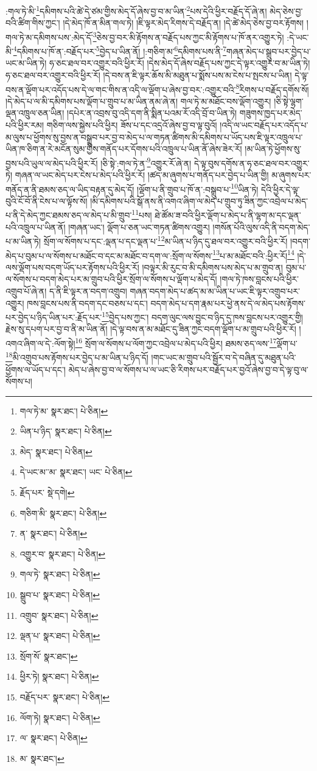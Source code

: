 :གལ་ཏེ་མི་\footnote{གལ་ཏེ་མ་  སྣར་ཐང་།  པེ་ཅིན། }དམིགས་པའི་ཚེ་དེ་ཙམ་གྱིས་མེད་དོ་ཞེས་བྱ་བ་མ་ཡིན་\footnote{ཡིན་པ་ཉིད་  སྣར་ཐང་།  པེ་ཅིན། }པས་དེའི་ཕྱིར་བརྗོད་དོ་ཞེ་ན། མེད་ཅེས་བྱ་བའི་ཚིག་གིས་ཀྱང་། །དེ་མེད་ཁོ་ན་མིན་གལ་ཏེ། །ཇི་ལྟར་མེད་རིགས་དེ་བརྗོད་ན། །དེ་ཚེ་མེད་ཅེས་བྱ་བར་རྟོགས། །གལ་ཏེ་མ་དམིགས་པས་:མེད་དོ་\footnote{མེད་  སྣར་ཐང་།  པེ་ཅིན། }ཅེས་བྱ་བར་མི་རྟོགས་ན་བརྗོད་པས་ཀྱང་མི་རྟོགས་པ་ཁོ་ནར་འགྱུར་ཏེ། :དེ་ཡང་མི་\footnote{དེ་ཡང་མ་་མ་  སྣར་ཐང་། ཡང་  པེ་ཅིན། }དམིགས་པ་ཁོ་ན་:བརྗོད་པར་\footnote{རྗོད་པར་  སྡེ་དགེ། }བྱེད་པ་ཡིན་ནོ། །:གཅིག་མ་\footnote{གཅིག་མི་  སྣར་ཐང་།  པེ་ཅིན། }དམིགས་པས་ནི་\footnote{ན་  སྣར་ཐང་།  པེ་ཅིན། }གཞན་མེད་པ་སྒྲུབ་པར་བྱེད་པ་ཡང་མ་ཡིན་ཏེ། ཧ་ཅང་ཐལ་བར་འགྱུར་བའི་ཕྱིར་རོ། །དེས་མེད་དོ་ཞེས་བརྗོད་པས་ཀྱང་དེ་ལྟར་འགྱུར་བ་མ་ཡིན་ཏེ། ཧ་ཅང་ཐལ་བར་འགྱུར་བའི་ཕྱིར་རོ། །དེ་བས་ན་ཇི་ལྟར་ཆོས་མི་མཐུན་པ་སྨོས་པས་མ་ངེས་པ་སྤངས་པ་ཡིན། དེ་ལྟ་བས་ན་ལྡོག་པར་འདོད་པས་དེ་ལ་གང་གིས་ན་འདི་ལ་ལྡོག་པ་ཞེས་བྱ་བར་:འགྱུར་བའི་\footnote{འགྱུར་བ་  སྣར་ཐང་།  པེ་ཅིན། }རིགས་པ་བརྗོད་དགོས་སོ། །དེ་མེད་པ་ལ་མི་དམིགས་པས་ལྡོག་པ་གྲུབ་པ་མ་ཡིན་ནམ་ཞེ་ན། གལ་ཏེ་མ་མཐོང་བས་ལྡོག་འགྱུར། །ཅི་སྟེ་ལྷག་ལྡན་འཁྲུལ་ཅན་ཡིན། །དཔེར་ན་འབྲས་བུ་འདི་དག་ནི་སྨིན་པའམ་རོ་འདི་བྲོ་བ་ཡིན་ཏེ། གཟུགས་ཁྱད་པར་མེད་པའི་ཕྱིར་རམ། གཅིག་ལས་སྐྱེས་པའི་ཕྱིར། ཟོས་པ་དང་འདྲའོ་ཞེས་བྱ་བ་ལྟ་བུའོ། །འདི་ལ་ཡང་བརྗོད་པར་འདོད་པ་མ་ལུས་པ་ཕྱོགས་སུ་བྱས་ན་བསྒྲུབ་པར་བྱ་བ་མེད་པ་ལ་གཏན་ཚིགས་མི་དམིགས་པ་ཡོད་པས་ཇི་ལྟར་འཁྲུལ་པ་ཡིན་ཁ་ཅིག་ན་རེ་མངོན་སུམ་གྱིས་གནོད་པར་དོགས་པའི་འཁྲུལ་པ་ཡིན་ནོ་ཞེས་ཟེར་རོ། །མ་ཡིན་ཏེ་ཕྱོགས་སུ་བྱས་པའི་ཡུལ་ལ་མེད་པའི་ཕྱིར་རོ། །ཅི་སྟེ་:གལ་ཏེ་ན་\footnote{གལ་ཏེ་  སྣར་ཐང་།  པེ་ཅིན། }འགྱུར་རོ་ཞེ་ན། དེ་ལྟ་བུས་དགོས་ན་ཧ་ཅང་ཐལ་བར་འགྱུར་ཏེ། གཞན་ལ་ཡང་མེད་པར་ངེས་པ་མེད་པའི་ཕྱིར་རོ། །ཚད་མ་ཞུགས་པ་གནོད་པར་བྱེད་པ་ཡིན་གྱི། མ་ཞུགས་པར་གནོད་ན་ནི་ཐམས་ཅད་ལ་ཡིད་བརྟན་དུ་མེད་དོ། །ལྡོག་པ་ནི་གྲུབ་པ་ཁོ་ན་:བསྒྲུབ་པ་\footnote{སྒྲུབ་པ་  སྣར་ཐང་།  པེ་ཅིན། }ཡིན་ཏེ། དེའི་ཕྱིར་དེ་ལྟ་བུའི་ངོ་བོ་ནི་ངེས་པ་ལ་ལྟོས་སོ། །མི་དམིགས་པའི་སྒོ་ནས་ནི་འགའ་ཞིག་ལ་མེད་པ་གྲུབ་ཏུ་ཟིན་ཀྱང་འབྲེལ་པ་མེད་པ་ནི་དེ་མེད་ཀྱང་ཐམས་ཅད་ལ་མེད་པ་མི་གྲུབ་\footnote{འགྲུབ་  སྣར་ཐང་།  པེ་ཅིན། }པས། ཐེ་ཚོམ་ཟ་བའི་ཕྱིར་ལྡོག་པ་མེད་པ་ནི་ལྷག་མ་དང་ལྡན་པའི་འཁྲུལ་པ་ཡིན་ནོ། །གཞན་ཡང་། ལྡོག་པ་ཅན་ཡང་གཏན་ཚིགས་འགྱུར། །གསོན་པོའི་ལུས་འདི་ནི་བདག་མེད་པ་མ་ཡིན་ཏེ། སྲོག་ལ་སོགས་པ་དང་:ལྡན་པ་དང་ལྡན་པ་\footnote{ལྡན་པ་  སྣར་ཐང་།  པེ་ཅིན། }མ་ཡིན་པ་ཉིད་དུ་ཐལ་བར་འགྱུར་བའི་ཕྱིར་རོ། །བདག་མེད་པ་བུམ་པ་ལ་སོགས་པ་མཐོང་བ་དང་མ་མཐོང་བ་དག་ལ་:སྲོག་ལ་སོགས་\footnote{སྲོག་སོ་  སྣར་ཐང་། }པ་མ་མཐོང་བའི་:ཕྱིར་རོ།\footnote{ཕྱིར་ཏེ།  སྣར་ཐང་།  པེ་ཅིན། } །དེ་ལས་ལྡོག་པས་བདག་ཡོད་པར་རྟོགས་པའི་ཕྱིར་རོ། །བལྟར་མི་རུང་བ་མི་དམིགས་པས་མེད་པ་མ་གྲུབ་ན། བུམ་པ་ལ་སོགས་པ་བདག་མེད་པར་མ་གྲུབ་པའི་ཕྱིར་སྲོག་ལ་སོགས་པ་ལྡོག་པ་མེད་དོ། །གལ་ཏེ་ཁས་བླངས་པའི་ཕྱིར་འགྲུབ་པོ་ཞེ་ན། ད་ནི་ཇི་ལྟར་ན་བདག་འགྲུབ། གཞན་བདག་མེད་པ་ཚད་མ་མ་ཡིན་པ་ཡང་ཇི་ལྟར་འགྲུབ་པར་འགྱུར། ཁས་བླངས་པས་ནི་བདག་དང་བཅས་པ་དང་། བདག་མེད་པ་དག་རྣམ་པར་ཕྱེ་ནས་དེ་ལ་མེད་པས་རྟོགས་པར་བྱེད་པ་ཉིད་ཡིན་པར་:རྗོད་པར་\footnote{བརྗོད་པར་  སྣར་ཐང་།  པེ་ཅིན། }བྱེད་པས་ཀྱང་། བདག་ལུང་ལས་བྱུང་བ་ཉིད་དུ་ཁས་བླངས་པར་འགྱུར་གྱི། རྗེས་སུ་དཔག་པར་བྱ་བ་ནི་མ་ཡིན་ནོ། །དེ་ལྟ་བས་ན་མ་མཐོང་དུ་ཟིན་ཀྱང་བདག་ལྡོག་པ་མ་གྲུབ་པའི་ཕྱིར་རོ། །འགའ་ཞིག་ལ་དེ་:ལོག་སྟེ།\footnote{ལོག་ཏེ།  སྣར་ཐང་།  པེ་ཅིན། } སྲོག་ལ་སོགས་པ་ལོག་ཀྱང་འབྲེལ་པ་མེད་པའི་ཕྱིར། ཐམས་ཅད་ལས་\footnote{ལ་  སྣར་ཐང་།  པེ་ཅིན། }ལྡོག་པ་\footnote{མ་  སྣར་ཐང་། }མི་འགྲུབ་པས་རྟོགས་པར་བྱེད་པ་མ་ཡིན་པ་ཉིད་དོ། །གང་ཡང་མ་གྲུབ་པའི་སྦྱོར་བ་དེ་བཞིན་དུ་མཐུན་པའི་ཕྱོགས་ལ་ཡོད་པ་དང་། མེད་པ་ཞེས་བྱ་བ་ལ་སོགས་པ་ལ་ཡང་ཅི་རིགས་པར་བརྗོད་པར་བྱའོ་ཞེས་བྱ་བ་དེ་ལྟ་བུ་ལ་སོགས་པ། 